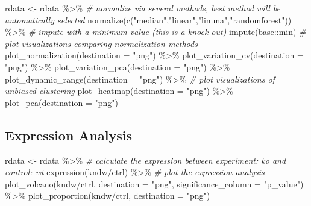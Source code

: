 \documentclass[
]{book}
\newenvironment{Shaded}{\begin{snugshade}}{\end{snugshade}}
\newcommand{\AttributeTok}[1]{\textcolor[rgb]{0.77,0.63,0.00}{#1}}
\newcommand{\CommentTok}[1]{\textcolor[rgb]{0.56,0.35,0.01}{\textit{#1}}}
\newcommand{\FunctionTok}[1]{\textcolor[rgb]{0.00,0.00,0.00}{#1}}
\newcommand{\NormalTok}[1]{#1}
\newcommand{\OtherTok}[1]{\textcolor[rgb]{0.56,0.35,0.01}{#1}}
\newcommand{\SpecialCharTok}[1]{\textcolor[rgb]{0.00,0.00,0.00}{#1}}
\newcommand{\StringTok}[1]{\textcolor[rgb]{0.31,0.60,0.02}{#1}}
\begin{document}
\begin{Shaded}
\begin{Highlighting}[]
\NormalTok{rdata }\OtherTok{\textless{}{-}}\NormalTok{ rdata }\SpecialCharTok{\%\textgreater{}\%}
  \CommentTok{\# normalize via several methods, best method will be automatically selected}
  \FunctionTok{normalize}\NormalTok{(}\FunctionTok{c}\NormalTok{(}\StringTok{"median"}\NormalTok{,}\StringTok{"linear"}\NormalTok{,}\StringTok{"limma"}\NormalTok{,}\StringTok{"randomforest"}\NormalTok{)) }\SpecialCharTok{\%\textgreater{}\%}
  \CommentTok{\# impute with a minimum value (this is a knock{-}out)}
  \FunctionTok{impute}\NormalTok{(base}\SpecialCharTok{::}\NormalTok{min)}
  \CommentTok{\# plot visualizations comparing normalization methods}
  \FunctionTok{plot\_normalization}\NormalTok{(}\AttributeTok{destination =} \StringTok{"png"}\NormalTok{) }\SpecialCharTok{\%\textgreater{}\%}
  \FunctionTok{plot\_variation\_cv}\NormalTok{(}\AttributeTok{destination =} \StringTok{"png"}\NormalTok{) }\SpecialCharTok{\%\textgreater{}\%} 
  \FunctionTok{plot\_variation\_pca}\NormalTok{(}\AttributeTok{destination =} \StringTok{"png"}\NormalTok{) }\SpecialCharTok{\%\textgreater{}\%}
  \FunctionTok{plot\_dynamic\_range}\NormalTok{(}\AttributeTok{destination =} \StringTok{"png"}\NormalTok{) }\SpecialCharTok{\%\textgreater{}\%}
  \CommentTok{\# plot visualizations of unbiased clustering}
  \FunctionTok{plot\_heatmap}\NormalTok{(}\AttributeTok{destination =} \StringTok{"png"}\NormalTok{) }\SpecialCharTok{\%\textgreater{}\%}
  \FunctionTok{plot\_pca}\NormalTok{(}\AttributeTok{destination =} \StringTok{"png"}\NormalTok{)}
\end{Highlighting}
\end{Shaded}

\hypertarget{expression-analysis}{%
\subsection{Expression Analysis}\label{expression-analysis}}

\begin{Shaded}
\begin{Highlighting}[]
\NormalTok{rdata }\OtherTok{\textless{}{-}}\NormalTok{ rdata }\SpecialCharTok{\%\textgreater{}\%}
  \CommentTok{\# calculate the expression between experiment: ko and control: wt}
  \FunctionTok{expression}\NormalTok{(kndw}\SpecialCharTok{/}\NormalTok{ctrl) }\SpecialCharTok{\%\textgreater{}\%}
  \CommentTok{\# plot the expression analysis}
  \FunctionTok{plot\_volcano}\NormalTok{(kndw}\SpecialCharTok{/}\NormalTok{ctrl, }\AttributeTok{destination =} \StringTok{"png"}\NormalTok{, }\AttributeTok{significance\_column =} \StringTok{"p\_value"}\NormalTok{) }\SpecialCharTok{\%\textgreater{}\%} 
  \FunctionTok{plot\_proportion}\NormalTok{(kndw}\SpecialCharTok{/}\NormalTok{ctrl, }\AttributeTok{destination =} \StringTok{"png"}\NormalTok{)}
\end{Highlighting}
\end{Shaded}
\end{document}
